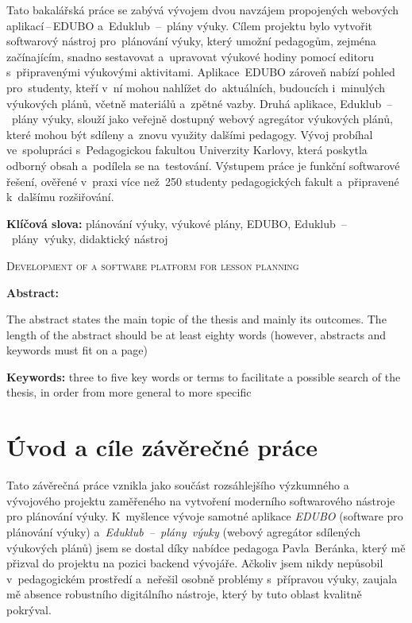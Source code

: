 \documentclass[male,czech,api_bc]{kitheses}
\newcommand{\nazeven}{Development of a software platform for lesson planning}       %
\begin{document}
Tato bakalářská práce se zabývá vývojem dvou navzájem propojených webových aplikací\,--\,EDUBO a~Eduklub~--~plány výuky. Cílem projektu bylo vytvořit softwarový nástroj pro~plánování výuky, který umožní pedagogům, zejména začínajícím, snadno sestavovat a~upravovat výukové hodiny pomocí editoru s~připravenými výukovými aktivitami. Aplikace~EDUBO zároveň nabízí pohled pro~studenty, kteří v~ní mohou nahlížet do~aktuálních, budoucích i~minulých výukových plánů, včetně materiálů a~zpětné vazby. Druhá aplikace, Eduklub~--~plány výuky, slouží jako veřejně dostupný webový agregátor výukových plánů, které mohou být sdíleny a~znovu využity dalšími pedagogy. Vývoj probíhal ve~spolupráci s~Pedagogickou fakultou Univerzity Karlovy, která poskytla odborný obsah a~podílela se na~testování. Výstupem práce je funkční softwarové řešení, ověřené v~praxi více než~250 studenty pedagogických fakult a~připravené k~dalšímu rozšiřování.

\textbf{Klíčová slova:} plánování výuky, výukové plány, EDUBO, Eduklub~--~plány~výuky, didaktický nástroj

\bigskip


\textsc{\nazeven}

\textbf{Abstract:}

The abstract states the main topic of the thesis and mainly its outcomes. The length of the abstract should be at least eighty words (however, abstracts and keywords must fit on a page)

\textbf{Keywords:} three to five key words or terms to facilitate a possible search of the thesis, in order from more general to more specific

\tableofcontents

\chapter{Úvod a cíle závěrečné práce}

Tato závěrečná práce vznikla jako součást rozsáhlejšího výzkumného a vývojového projektu zaměřeného na vytvoření moderního softwarového nástroje pro plánování výuky. K~myšlence vývoje samotné aplikace \textit{EDUBO} (software pro plánování výuky) a~\textit{Eduklub~--~plány~výuky} (webový agregátor sdílených výukových plánů) jsem se dostal díky nabídce pedagoga Pavla~Beránka, který mě přizval do projektu na pozici backend vývojáře. Ačkoliv jsem nikdy nepůsobil v~pedagogickém prostředí a~neřešil osobně problémy s~přípravou výuky, zaujala mě absence robustního digitálního nástroje, který by tuto oblast kvalitně pokrýval.
\end{document}
